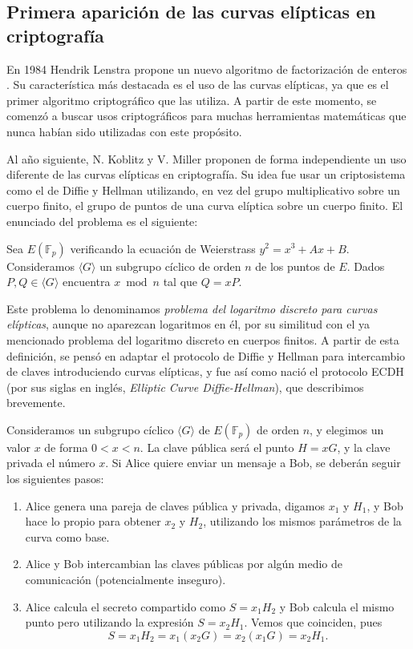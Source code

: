\documentclass[
  a4paper,
  12pt,
  spanish,
]{scrartcl}
\begin{document}
\subsection{Primera aparición de las curvas elípticas en criptografía}

En 1984 Hendrik Lenstra propone un nuevo algoritmo de factorización de enteros \parencite{lenstra_divisors_1984}. Su característica más destacada es el uso de las curvas elípticas, ya que es el primer algoritmo criptográfico que las utiliza. A partir de este momento, se comenzó a buscar usos criptográficos para muchas herramientas matemáticas que nunca habían sido utilizadas con este propósito.

Al año siguiente, N. Koblitz \parencite{koblitz_elliptic_1987} y V. Miller \parencite{williams_use_1986} proponen de forma independiente un uso diferente de las curvas elípticas en criptografía. Su idea fue usar un criptosistema como el de Diffie y Hellman utilizando, en vez del grupo multiplicativo sobre un cuerpo finito, el grupo de puntos de una curva elíptica sobre un cuerpo finito. El enunciado del problema es el siguiente:
\begin{displayquote}
  Sea $E(\mathbb{F}_p)$ verificando la ecuación de Weierstrass $y^2 =x^3 + Ax + B$. Consideramos $\langle G \rangle$ un subgrupo cíclico de orden $n$ de los puntos de $E$. Dados $P,Q \in \langle G \rangle$ encuentra $x \bmod{n}$ tal que $Q=xP$. 
\end{displayquote} 

Este problema lo denominamos \textit{problema del logaritmo discreto para curvas elípticas}, aunque no aparezcan logaritmos en él, por su similitud con el ya mencionado problema del logaritmo discreto en cuerpos finitos. A partir de esta definición, se pensó en adaptar el protocolo de Diffie y Hellman para intercambio de claves introduciendo curvas elípticas, y fue así como nació el protocolo ECDH (por sus siglas en inglés, \textit{Elliptic Curve Diffie-Hellman}), que describimos brevemente.

    Consideramos un subgrupo cíclico $\langle G \rangle$ de $E(\mathbb{F}_p)$ de orden $n$, y elegimos un valor \(x\) de forma $0 < x < n$. La clave pública será el punto $H = xG$, y la clave privada el número $x$. Si Alice quiere enviar un mensaje a Bob, se deberán seguir los siguientes pasos:
    
    \begin{enumerate}
	\item Alice genera una pareja de claves pública y privada, digamos $x_1$ y $H_1$, y Bob hace lo propio para obtener $x_2$ y $H_2$, utilizando los mismos parámetros de la curva como base.
	\item Alice y Bob intercambian las claves públicas por algún medio de comunicación (potencialmente inseguro).
	\item Alice calcula el secreto compartido como $S = x_1H_2$ y Bob calcula el mismo punto pero utilizando la expresión $S = x_2H_1$. Vemos que coinciden, pues \[ S = x_1H_2 = x_1(x_2G) = x_2(x_1G) = x_2H_1. \]
\end{enumerate}
\end{document}
